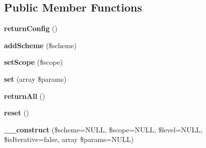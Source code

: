 \subsection*{\-Public \-Member \-Functions}
\begin{DoxyCompactItemize}
\item 
\hypertarget{class_config_styles_1_1_bracket_config_1_1_bracket_config_af1c51a63a389a43351be05ecc0d1d0e5}{
{\bfseries return\-Config} ()}
\label{class_config_styles_1_1_bracket_config_1_1_bracket_config_af1c51a63a389a43351be05ecc0d1d0e5}

\item 
\hypertarget{class_config_styles_1_1_bracket_config_1_1_bracket_config_aa8986047ac0c180a616c2d4a1f01b4f2}{
{\bfseries add\-Scheme} (\$scheme)}
\label{class_config_styles_1_1_bracket_config_1_1_bracket_config_aa8986047ac0c180a616c2d4a1f01b4f2}

\item 
\hypertarget{class_config_styles_1_1_bracket_config_1_1_bracket_config_a34b78f906f96dba1368e226dfaf3ebc4}{
{\bfseries set\-Scope} (\$scope)}
\label{class_config_styles_1_1_bracket_config_1_1_bracket_config_a34b78f906f96dba1368e226dfaf3ebc4}

\item 
\hypertarget{class_config_styles_1_1_bracket_config_1_1_bracket_config_abcc82156be4ee9a19d38b8285b1dfd6a}{
{\bfseries set} (array \$params)}
\label{class_config_styles_1_1_bracket_config_1_1_bracket_config_abcc82156be4ee9a19d38b8285b1dfd6a}

\item 
\hypertarget{class_config_styles_1_1_bracket_config_1_1_bracket_config_a462b00e9adf6547f75d85adeeac98a39}{
{\bfseries return\-All} ()}
\label{class_config_styles_1_1_bracket_config_1_1_bracket_config_a462b00e9adf6547f75d85adeeac98a39}

\item 
\hypertarget{class_config_styles_1_1_bracket_config_1_1_bracket_config_a4a20559544fdf4dcb457e258dc976cf8}{
{\bfseries reset} ()}
\label{class_config_styles_1_1_bracket_config_1_1_bracket_config_a4a20559544fdf4dcb457e258dc976cf8}

\item 
\hypertarget{class_config_styles_1_1_bracket_config_1_1_bracket_config_a264e813bbeff000def4b92b856b815d0}{
{\bfseries \-\_\-\-\_\-construct} (\$scheme=\-N\-U\-L\-L, \$scope=\-N\-U\-L\-L, \$level=\-N\-U\-L\-L, \$is\-Iterative=false, array \$params=\-N\-U\-L\-L)}
\label{class_config_styles_1_1_bracket_config_1_1_bracket_config_a264e813bbeff000def4b92b856b815d0}

\end{DoxyCompactItemize}
